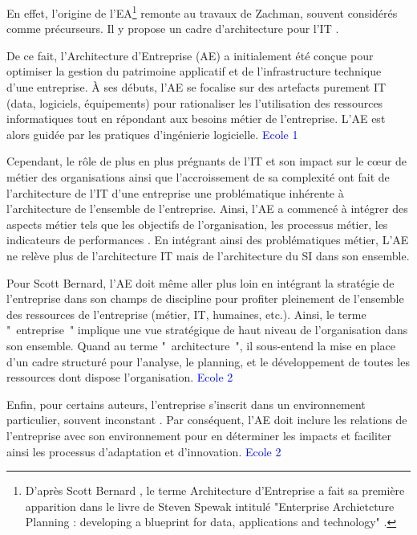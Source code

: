En effet, l'origine de l'EA\footnote{D'après Scott Bernard 
\cite{bernard2012introduction}, le terme Architecture d'Entreprise a fait sa 
première apparition dans le livre de Steven Spewak intitulé "Enterprise 
Archietcture Planning : developing a blueprint for data, applications and 
technology" \cite{spewak1993enterprise}.} remonte au travaux de Zachman, souvent 
considérés comme précurseurs. Il y propose un cadre d'architecture pour l'IT 
\cite{zachman1987framework}.

De ce fait, l'Architecture d'Entreprise (AE) a initialement été conçue pour 
optimiser la 
gestion du patrimoine applicatif et de l'infrastructure technique d'une  
entreprise. À ses débuts, l'AE se 
focalise sur des artefacts purement IT (data, logiciels, équipements) pour 
rationaliser les l'utilisation des ressources informatiques 
\cite{winter2006essential} tout en répondant aux besoins métier de l'entreprise. 
L'AE est alors guidée par les pratiques d'ingénierie logicielle. \textcolor{blue}{Ecole 1} 
 

Cependant, le rôle de plus en plus prégnants de l'IT et son impact sur le c\oe{}ur de métier des organisations ainsi que l'accroissement de sa complexité 
\cite{ranganathan2005enterprise} ont fait de l'architecture de l'IT d'une 
entreprise une problématique inhérente à l'architecture de l'ensemble de 
l'entreprise. Ainsi, l'AE a commencé à intégrer des aspects métier tels que les 
objectifs de l'organisation, les processus métier, les indicateurs de 
performances \cite{winter2006essential}. En intégrant ainsi des problématiques 
métier, L'AE ne relève plus de l'architecture IT mais de l'architecture du SI 
dans son ensemble.

Pour Scott Bernard, l'AE doit même aller plus loin en intégrant la stratégie de 
l'entreprise \cite{bernard2012introduction} dans son champs de discipline pour 
profiter pleinement de l'ensemble des ressources de l'entreprise (métier, IT, 
humaines, etc.). Ainsi, le terme "~entreprise~" implique une vue stratégique de 
haut niveau de l'organisation dans son ensemble. Quand au terme 
"~architecture~", il sous-entend la mise en place d'un cadre structuré pour 
l'analyse, le planning, et le développement de toutes les ressources dont 
dispose l'organisation. \textcolor{blue}{Ecole 2} 

Enfin, pour certains auteurs, l'entreprise s'inscrit dans un environnement 
particulier, souvent inconstant \cite{lapalme2012three}. Par conséquent, l'AE 
doit inclure les relations de l'entreprise avec son environnement pour en 
déterminer les impacts et faciliter ainsi les processus d'adaptation  et 
d'innovation. \textcolor{blue}{Ecole 2}


